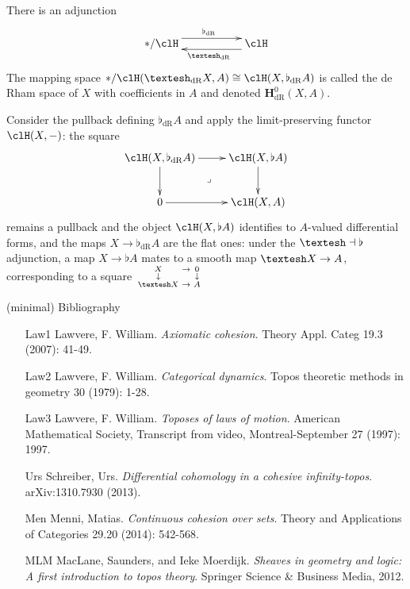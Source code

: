 \documentclass[presentation]{beamer}
\begin{document}
%
%
%
%
%
%
\begin{frame}
 There is an adjunction 
 \[
 \xymatrix{
  {*/\clH}\ar@<5pt>[rr]^{\flat_\text{dR}} &&\ar@<5pt>[ll]^{\shape_\text{dR}} \clH
 } 
 \]
 The mapping space $*/\clH(\shape_\text{dR}X,A)\cong \clH(X, \flat_\text{dR}A)$ is called the \alert{}{de Rham space} of $X$ with coefficients in $A$ and denoted $\mathbf{H}^0_\text{dR}(X,A)$.
\end{frame}
%
%
%
%
%
\begin{frame}
 Consider the pullback defining $\flat_\text{dR}A$ and apply the limit-preserving functor $\clH(X,-)$: the square
 \[\xymatrix{\clH(X,\flat_\text{dR}A)\ar[r]\ar[d]\ar@{}[dr]|\lrcorner & \clH(X,\flat A) \ar[d]\\ 
 0 \ar[r] & \clH(X,A) }\]
 remains a pullback and the object $\clH(X,\flat A)$ identifies to \alert{$A$-valued differential forms}, and the maps $X \to \flat_\text{dR}A$ are the \alert{flat} ones: under the $\shape\dashv \flat$ adjunction, a map $X\to \flat A$ mates to a smooth map $\shape X \to A$, corresponding to a square
 $
\begin{smallmatrix}
 X &\to & 0 \\
 \downarrow && \downarrow \\
 \shape X &\to& A
\end{smallmatrix}
 $
\end{frame}
%
%
%
%
%
%
%
%
\begin{frame}{(minimal) Bibliography}
  \centering
  \footnotesize
  \begin{minipage}{.85\textwidth}
  \begin{itemize}
  \item[Law1] Lawvere, F. William. \emph{Axiomatic cohesion}. Theory Appl. Categ 19.3 (2007): 41-49.
  \item[Law2] Lawvere, F. William. \emph{Categorical dynamics}. Topos theoretic methods in geometry 30 (1979): 1-28.
  \item[Law3] Lawvere, F. William. \emph{Toposes of laws of motion}. American Mathematical Society, Transcript from video, Montreal-September 27 (1997): 1997.
  \item[Urs] Schreiber, Urs. \emph{Differential cohomology in a cohesive infinity-topos}. arXiv:1310.7930 (2013).
  \item[Men] Menni, Matias. \emph{Continuous cohesion over sets}. Theory and Applications of Categories 29.20 (2014): 542-568.
  \item[MLM] MacLane, Saunders, and Ieke Moerdijk. \emph{Sheaves in geometry and logic: A first introduction to topos theory}. Springer Science \& Business Media, 2012.
  \end{itemize}
  \end{minipage}
  \end{frame}  
\end{document}
